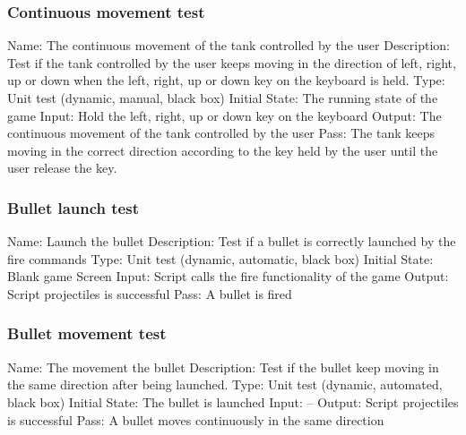 \documentclass{article}
\begin{document}
\subsubsection{Continuous movement test}
Name:  The continuous movement of the tank controlled by the user\newline
Description: Test if the tank controlled by the user keeps moving in the 
direction of left, right, up or down when the left, right, up or down key on 
the keyboard is held. \newline
Type: Unit test (dynamic, manual, black box) \newline
Initial State:  The running state of the game \newline
Input: Hold the left, right, up or down key on the keyboard\newline
Output: The continuous movement of the tank controlled by the user\newline
Pass:  The tank keeps moving in the correct direction according to the key 
held by the user until the user release the key. \newline

\subsubsection{Bullet launch test}
Name:  Launch the bullet\newline
Description: Test if a bullet is correctly launched by the fire commands \newline
Type: Unit test (dynamic, automatic, black box) \newline
Initial State: Blank game Screen\newline
Input: Script calls the fire functionality of the game\newline
Output: Script projectiles is successful  \newline
Pass: A bullet is fired\newline

\subsubsection{Bullet movement test}
Name:  The movement the bullet\newline
Description: Test if the bullet keep moving in the same direction after being 
launched. \newline
Type: Unit test (dynamic, automated, black box) \newline
Initial State:  The bullet is launched \newline
Input: --\newline
Output: Script projectiles is successful  \newline
Pass: A bullet moves continuously in the same direction\newline
\end{document}
